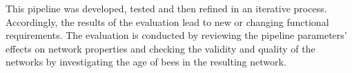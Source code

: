 This pipeline was developed, tested and then refined in an iterative process.
Accordingly, the results of the evaluation lead to new or changing functional requirements.
The evaluation is conducted by reviewing the pipeline parameters' effects on network properties and checking the validity and quality of the networks by investigating the age of bees in the resulting network.









